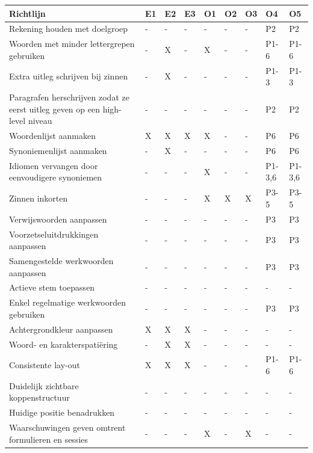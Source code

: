 \begin{table}[H]
	\centering
	\begin{tabular}{ | m{8cm} | m{0.5cm} | m{0.5cm} | m{0.5cm} | m{0.5cm} | m{0.5cm} | m{0.5cm} | m{1cm} | m{1cm} | }
		\hline
		Richtlijn & E1 & E2 & E3 & O1 & O2 & O3 & O4 & O5 \\ \hline
		Rekening houden met doelgroep & - & - & - & - & - & - & P2 & P2 \\ \hline
		Woorden met minder lettergrepen gebruiken & - & X & - & X & - & - & P1-6 & P1-6 \\ \hline
		Extra uitleg schrijven bij zinnen & - & X & - & - & - & - & P1-3 & P1-3 \\ \hline
		Paragrafen herschrijven zodat ze eerst uitleg geven op een high-level niveau & - & - & - & - & - & - & P2 & P2 \\ \hline
		Woordenlijst aanmaken & X & X & X & X & - & - & P6 & P6 \\ \hline
		Synoniemenlijst aanmaken & - & X & - & - & - & - & P6 & P6 \\ \hline
		Idiomen vervangen door eenvoudigere synoniemen & - & - & - & X & - & - & P1-3,6 & P1-3,6 \\ \hline
		Zinnen inkorten & - & - & - & X & X & X & P3-5 & P3-5 \\ \hline
		Verwijswoorden aanpassen & - & - & - & - & - & - & P3 & P3 \\ \hline
		Voorzetseluitdrukkingen aanpassen & - & - & - & - & - & - & P3 & P3 \\ \hline
		Samengestelde werkwoorden aanpassen & - & - & - & - & - & - & P3 & P3 \\ \hline
		Actieve stem toepassen & - & - & - & - & - & - & - & - \\ \hline
		Enkel regelmatige werkwoorden gebruiken & - & - & - & - & - & - & P3 & P3 \\ \hline
		Achtergrondkleur aanpassen & X & X & X & - & - & - & - & - \\ \hline
		Woord- en karakterspatiëring & - & X & X & - & - & - & - & - \\ \hline
		Consistente lay-out & X & X & X & - & - & - & P1-6 & P1-6 \\ \hline
		Duidelijk zichtbare koppenstructuur & - & - & - & - & - & - & - & - \\ \hline
		Huidige positie benadrukken & - & - & - & - & - & - & - & - \\ \hline
		Waarschuwingen geven omtrent formulieren en sessies & - & - & - & X & - & X & - & - \\ \hline

\end{tabular}
\end{table}
